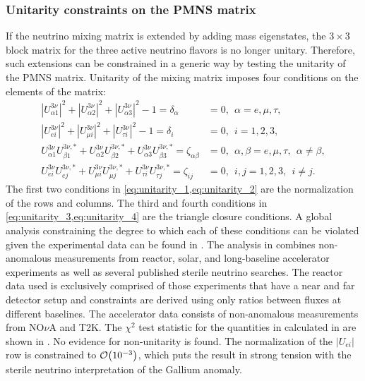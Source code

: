 \subsubsection{Unitarity constraints on the PMNS matrix}
If the neutrino mixing matrix is extended by adding mass eigenstates, the $3\times3$ block matrix for the three active neutrino flavors is no longer unitary.
Therefore, such extensions can be constrained in a generic way by testing the unitarity of the PMNS matrix.
Unitarity of the mixing matrix imposes four conditions on the elements of the matrix:
\begin{align}
    |U^{3\nu}_{\alpha 1}|^2 + |U^{3\nu}_{\alpha 2}|^2 + |U^{3\nu}_{\alpha 3}|^2 - 1 = \delta_\alpha &= 0,~~\alpha=e,\mu,\tau, \label{eq:unitarity_1}
    \\
    |U^{3\nu}_{e i}|^2 + |U^{3\nu}_{\mu i}|^2 + |U^{3\nu}_{\tau i}|^2 -1 = \delta_i &= 0,~~i=1,2,3, \label{eq:unitarity_2}
    \\
    U^{3\nu}_{\alpha 1}U^{3\nu,*}_{\beta 1} + U^{3\nu}_{\alpha 2}U^{3\nu,*}_{\beta 2} + U^{3\nu}_{\alpha 3}U^{3\nu,*}_{\beta 3} = \zeta_{\alpha\beta} &= 0,~~\alpha, \beta = e,\mu,\tau,~~\alpha\neq\beta, \label{eq:unitarity_3}
    \\
    U^{3\nu}_{e i}U^{3\nu,*}_{e j} + U^{3\nu}_{\mu i}U^{3\nu,*}_{\mu j} + U^{3\nu}_{\tau i}U^{3\nu,*}_{\tau j} = \zeta_{ij} &= 0,~~i,j  =1,2,3,~~i\neq j. \label{eq:unitarity_4}
\end{align}
The first two conditions in \cref{eq:unitarity_1,eq:unitarity_2} are the normalization of the rows and columns. The third and fourth conditions in \cref{eq:unitarity_3,eq:unitarity_4} are the triangle closure conditions. A global analysis constraining the degree to which each of these conditions can be violated given the experimental data can be found in . The analysis in \cite{global_unitarity_Hu} combines non-anomalous measurements from reactor, solar, and long-baseline accelerator experiments as well as several published sterile neutrino searches. The reactor data used is exclusively comprised of those experiments that have a near and far detector setup and constraints are derived using only ratios between fluxes at different baselines. The accelerator data consists of non-anomalous measurements from NO$\nu$A and T2K. The $\chi^2$ test statistic for the quantities in  calculated in \cite{global_unitarity_Hu} are shown in . No evidence for non-unitarity is found. The normalization of the $|U_{ei}|$ row is constrained to $\order{\num{e-3}}$, which puts the result in strong tension with the sterile neutrino interpretation of the Gallium anomaly.
